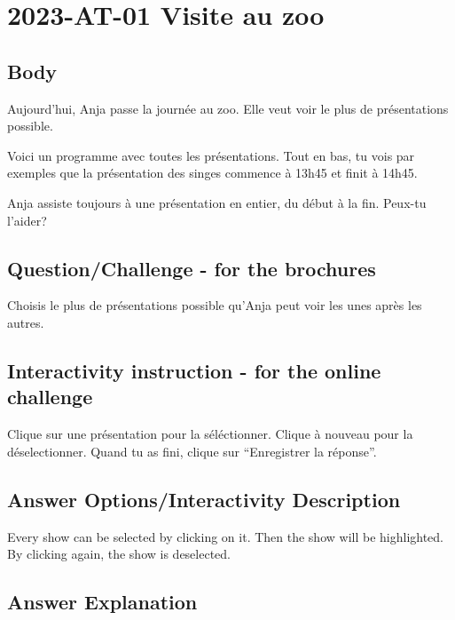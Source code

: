 \documentclass[a4paper,11pt]{report}
\newcommand{\taskGraphicsFolder}{..}
\begin{document}
\section*{\centering{} 2023-AT-01 Visite au zoo}


\subsection*{Body}

Aujourd’hui, Anja passe la journée au zoo. Elle veut voir le plus de présentations possible.

Voici un programme avec toutes les présentations. Tout en bas, tu vois par exemples que la présentation des singes commence à 13h45 et finit à 14h45.

{\centering%
\par}

Anja assiste toujours à une présentation en entier, du début à la fin. Peux-tu l’aider?

{\em


\subsection*{Question/Challenge - for the brochures}

Choisis le plus de présentations possible qu’Anja peut voir les unes après les autres.

}


\subsection*{Interactivity instruction - for the online challenge}

Clique sur une présentation pour la séléctionner. Clique à nouveau pour la déselectionner. Quand tu as fini, clique sur “Enregistrer la réponse”.

\begingroup
\renewcommand{\arraystretch}{1.5}
\subsection*{Answer Options/Interactivity Description}

Every show can be selected by clicking on it. Then the show will be highlighted. By clicking again, the show is deselected.

\endgroup

\subsection*{Answer Explanation}
\end{document}
